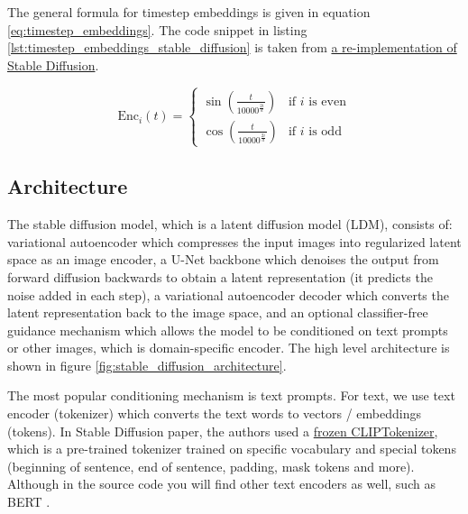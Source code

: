 The general formula for timestep embeddings is given in equation \ref{eq:timestep_embeddings}. The code snippet in listing \ref{lst:timestep_embeddings_stable_diffusion} is taken from \href{https://github.com/hkproj/pytorch-stable-diffusion/blob/e0cb06de011787cdf13eed7b4287ad8410491149/sd/pipeline.py#L164}{a re-implementation of Stable Diffusion}.

\begin{equation}
    \text{Enc}_i(t) =
    \begin{cases}
        \sin\left(\frac{t}{10000^{\frac{2i}{d}}}\right) & \text{if } i \text{ is even} \\
        \cos\left(\frac{t}{10000^{\frac{2i}{d}}}\right) & \text{if } i \text{ is odd}
    \end{cases}
    \label{eq:timestep_embeddings}
\end{equation}








\subsection{Architecture}

The stable diffusion model, which is a latent diffusion model (LDM), consists of: variational autoencoder which compresses the input images into regularized latent space as an image encoder, a U-Net backbone which denoises the output from forward diffusion backwards to obtain a latent representation (it predicts the noise added in each step), a variational autoencoder decoder which converts the latent representation back to the image space, and an optional classifier-free guidance mechanism which allows the model to be conditioned on text prompts or other images, which is domain-specific encoder. The high level architecture is shown in figure \ref{fig:stable_diffusion_architecture}.

The most popular conditioning mechanism is text prompts. For text, we use text encoder (tokenizer) which converts the text words to vectors / embeddings (tokens). In Stable Diffusion paper, the authors used a \href{https://github.com/CompVis/latent-diffusion/blob/a506df5756472e2ebaf9078affdde2c4f1502cd4/ldm/modules/encoders/modules.py#L138}{frozen CLIPTokenizer}, which is a pre-trained tokenizer trained on specific vocabulary and special tokens (beginning of sentence, end of sentence, padding, mask tokens and more). Although in the source code you will find other text encoders as well, such as BERT \cite{bert}.

